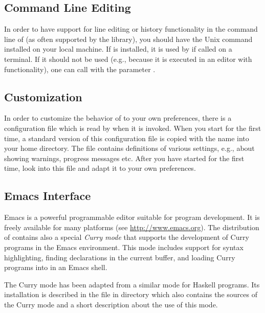 \subsection{Command Line Editing}
\label{sec:readline}

In order to have support for line editing or history functionality
in the command line of \CYS (as often supported by the 
library), you should have the Unix command  installed
on your local machine.
If  is installed, it is used by \CYS if called on a terminal.
If it should not be used (e.g., because it is executed
in an editor with  functionality), one can
call \CYS with the parameter .


\subsection{Customization}
\label{sec-customization}

In order to customize the behavior of \CYS to your own preferences,
there is a configuration file which is read by \CYS when it is invoked.
When you start \CYS for the first time, a standard version of
this configuration file is copied with the name
into your home directory. The file contains definitions
of various settings, e.g., about showing warnings, progress messages etc.
After you have started \CYS for the first time, look into this file
and adapt it to your own preferences.


\subsection{Emacs Interface}

Emacs is a powerful programmable editor suitable for program development.
It is freely available for many platforms
(see \url{http://www.emacs.org}).
The distribution of \CYS contains also a special
\emph{Curry mode}
that supports the development of Curry programs in
the Emacs environment.
This mode includes support for syntax highlighting,
finding declarations in the current buffer, and
loading Curry programs into \CYS
in an Emacs shell.

The Curry mode has been adapted from a similar mode for Haskell programs.
Its installation is described in the file 
in directory  which also contains
the sources of the Curry mode and a short description about
the use of this mode.


